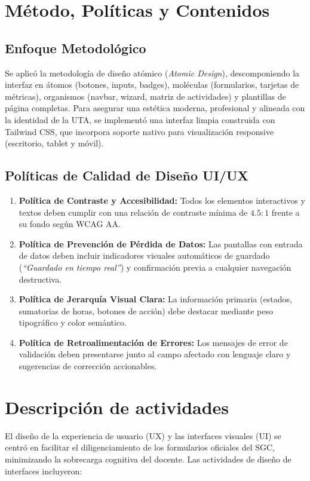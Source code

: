 \documentclass[12pt,a4paper]{article}
\begin{document}
\section{Método, Políticas y Contenidos}
\subsection{Enfoque Metodológico}
Se aplicó la metodología de diseño atómico (\textit{Atomic Design}), descomponiendo la interfaz en átomos (botones, inputs, badges), moléculas (formularios, tarjetas de métricas), organismos (navbar, wizard, matriz de actividades) y plantillas de página completas. Para asegurar una estética moderna, profesional y alineada con la identidad de la UTA, se implementó una interfaz limpia construida con Tailwind CSS, que incorpora soporte nativo para visualización responsive (escritorio, tablet y móvil).

\subsection{Políticas de Calidad de Diseño UI/UX}
\begin{enumerate}[leftmargin=1.5em, itemsep=2pt]
    \item \textbf{Política de Contraste y Accesibilidad:} Todos los elementos interactivos y textos deben cumplir con una relación de contraste mínima de $4.5:1$ frente a su fondo según WCAG AA.
    \item \textbf{Política de Prevención de Pérdida de Datos:} Las pantallas con entrada de datos deben incluir indicadores visuales automáticos de guardado (\textit{``Guardado en tiempo real''}) y confirmación previa a cualquier navegación destructiva.
    \item \textbf{Política de Jerarquía Visual Clara:} La información primaria (estados, sumatorias de horas, botones de acción) debe destacar mediante peso tipográfico y color semántico.
    \item \textbf{Política de Retroalimentación de Errores:} Los mensajes de error de validación deben presentarse junto al campo afectado con lenguaje claro y sugerencias de corrección accionables.
\end{enumerate}

\section{Descripción de actividades}
El diseño de la experiencia de usuario (UX) y las interfaces visuales (UI) se centró en facilitar el diligenciamiento de los formularios oficiales del SGC, minimizando la sobrecarga cognitiva del docente. Las actividades de diseño de interfaces incluyeron:
\end{document}
